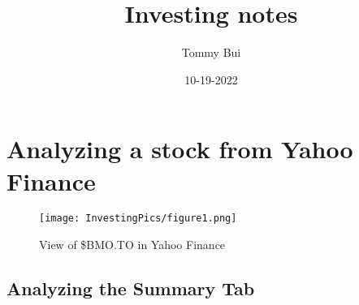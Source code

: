 \documentclass{article}
\title{Investing notes}
\date{10-19-2022}
\author{Tommy Bui}
\begin{document}
	\maketitle
	\newpage

	\tableofcontents
	\newpage

	\section{Analyzing a stock from Yahoo Finance} 
	
	\begin{figure}[h!]
		\texttt{[image: InvestingPics/figure1.png]}
		\caption{View of \$BMO.TO in Yahoo Finance}
		\label{fig:chart1}
	\end{figure}


	\subsection{Analyzing the Summary Tab}
\end{document}

